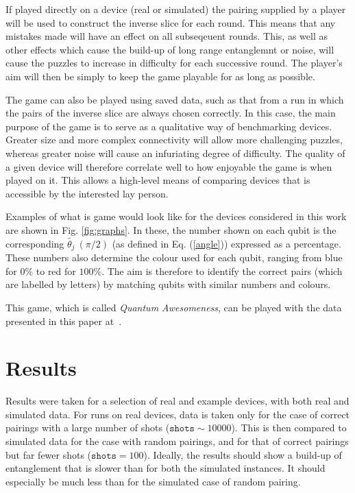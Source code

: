\documentclass[aps,prl,twocolumn,showpacs,preprintnumbers]{revtex4-1}
\begin{document}
If played directly on a device (real or simulated) the pairing supplied by a player will be used to construct the inverse slice for each round. This means that any mistakes made will have an effect on all subseqeuent rounds. This, as well as other effects which cause the build-up of long range entanglemnt or noise, will cause the puzzles to increase in difficulty for each successive round. The player’s aim will then be simply to keep the game playable for as long as possible.

The game can also be played using saved data, such as that from a run in which the pairs of the inverse slice are always chosen correctly. In this case, the main purpose of the game is to serve as a qualitative way of benchmarking devices. Greater size and more complex connectivity will allow more challenging puzzles, whereas greater noise will cause an infuriating degree of difficulty. The quality of a given device will therefore correlate well to how enjoyable the game is when played on it. This allows a high-level means of comparing devices that is accessible by the interested lay person.

Examples of what is game would look like for the devices considered in this work are shown in Fig. \ref{fig:graphs}. In these, the number shown on each qubit is the corresponding $\tilde{\theta_j} \ (\pi/2)$ (as defined in Eq. (\ref{angle})) expressed as a percentage. These numbers also determine the colour used for each qubit, ranging from blue for $0\%$ to red for $100\%$. The aim is therefore to identify the correct pairs (which are labelled by letters) by matching qubits with similar numbers and colours.

This game, which is called \textit{Quantum Awesomeness}, can be played with the data presented in this paper at~\cite{awesomeness}.


\section{Results}

Results were taken for a selection of real and example devices, with both real and simulated data. For runs on real devices, data is taken only for the case of correct pairings with a large number of shots ($\mathtt{shots}\sim 10000$). This is then compared to simulated data for the case with random pairings, and for that of correct pairings but far fewer shots ($\mathtt{shots} = 100$). Ideally, the results should show a build-up of entanglement that is slower than for both the simulated instances. It should especially be much less than for the simulated case of random pairing.
\end{document}
